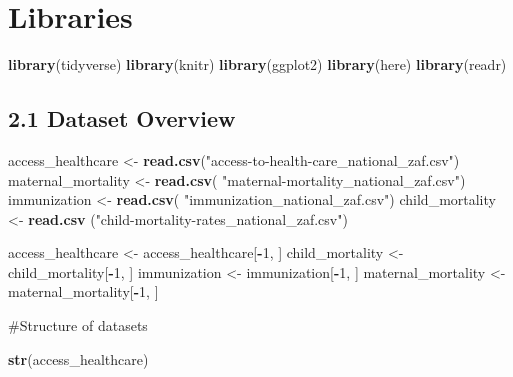 \documentclass[
]{article}
\author{}
\date{\vspace{-2.5em}}
\newenvironment{Shaded}{\begin{snugshade}}{\end{snugshade}}
\newcommand{\DecValTok}[1]{\textcolor[rgb]{0.00,0.00,0.81}{#1}}
\newcommand{\FunctionTok}[1]{\textcolor[rgb]{0.13,0.29,0.53}{\textbf{#1}}}
\newcommand{\NormalTok}[1]{#1}
\newcommand{\OtherTok}[1]{\textcolor[rgb]{0.56,0.35,0.01}{#1}}
\newcommand{\SpecialCharTok}[1]{\textcolor[rgb]{0.81,0.36,0.00}{\textbf{#1}}}
\newcommand{\StringTok}[1]{\textcolor[rgb]{0.31,0.60,0.02}{#1}}
\begin{document}
\section{Libraries}\label{libraries}

\begin{Shaded}
\begin{Highlighting}[]
\FunctionTok{library}\NormalTok{(tidyverse)}
\FunctionTok{library}\NormalTok{(knitr)}
\FunctionTok{library}\NormalTok{(ggplot2)}
\FunctionTok{library}\NormalTok{(here)}
\FunctionTok{library}\NormalTok{(readr)}
\end{Highlighting}
\end{Shaded}

\subsection{2.1 Dataset Overview}\label{dataset-overview}

\begin{Shaded}
\begin{Highlighting}[]
\NormalTok{access\_healthcare }\OtherTok{\textless{}{-}} \FunctionTok{read.csv}\NormalTok{(}\StringTok{"access{-}to{-}health{-}care\_national\_zaf.csv"}\NormalTok{)}
\NormalTok{maternal\_mortality }\OtherTok{\textless{}{-}} \FunctionTok{read.csv}\NormalTok{( }\StringTok{"maternal{-}mortality\_national\_zaf.csv"}\NormalTok{)}
\NormalTok{immunization }\OtherTok{\textless{}{-}} \FunctionTok{read.csv}\NormalTok{( }\StringTok{"immunization\_national\_zaf.csv"}\NormalTok{)}
\NormalTok{child\_mortality }\OtherTok{\textless{}{-}} \FunctionTok{read.csv}\NormalTok{ (}\StringTok{"child{-}mortality{-}rates\_national\_zaf.csv"}\NormalTok{)}

\NormalTok{access\_healthcare }\OtherTok{\textless{}{-}}\NormalTok{ access\_healthcare[}\SpecialCharTok{{-}}\DecValTok{1}\NormalTok{, ]}
\NormalTok{child\_mortality }\OtherTok{\textless{}{-}}\NormalTok{ child\_mortality[}\SpecialCharTok{{-}}\DecValTok{1}\NormalTok{, ]}
\NormalTok{immunization }\OtherTok{\textless{}{-}}\NormalTok{ immunization[}\SpecialCharTok{{-}}\DecValTok{1}\NormalTok{, ]}
\NormalTok{maternal\_mortality }\OtherTok{\textless{}{-}}\NormalTok{ maternal\_mortality[}\SpecialCharTok{{-}}\DecValTok{1}\NormalTok{, ]}
\end{Highlighting}
\end{Shaded}

\#Structure of datasets

\begin{Shaded}
\begin{Highlighting}[]
\FunctionTok{str}\NormalTok{(access\_healthcare)}
\end{Highlighting}
\end{Shaded}
\end{document}
